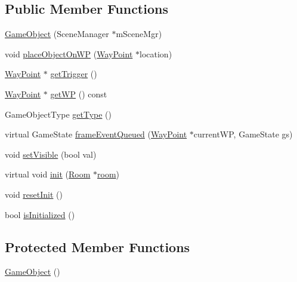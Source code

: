 \subsection*{\-Public \-Member \-Functions}
\begin{DoxyCompactItemize}
\item 
\hyperlink{classGameObject_a0996f1381d0512d9db0a89121e07335a}{\-Game\-Object} (\-Scene\-Manager $\ast$m\-Scene\-Mgr)
\item 
void \hyperlink{classGameObject_aa9a2c30e2cc2f6a7ddbb55d46dd9b45d}{place\-Object\-On\-W\-P} (\hyperlink{classWayPoint}{\-Way\-Point} $\ast$location)
\item 
\hyperlink{classWayPoint}{\-Way\-Point} $\ast$ \hyperlink{classGameObject_a0000c172fae6c5609ecd34ca0c335d8c}{get\-Trigger} ()
\item 
\hyperlink{classWayPoint}{\-Way\-Point} $\ast$ \hyperlink{classGameObject_a2e858346bacb7c0c078284dee036a927}{get\-W\-P} () const 
\item 
\-Game\-Object\-Type \hyperlink{classGameObject_a248b04d1269cb1d28c8b0cc2e886c1cb}{get\-Type} ()
\item 
virtual \-Game\-State \hyperlink{classGameObject_aa643df342c50df77f053eee2c703c619}{frame\-Event\-Queued} (\hyperlink{classWayPoint}{\-Way\-Point} $\ast$current\-W\-P, \-Game\-State gs)
\item 
void \hyperlink{classGameObject_a1f5648272592844af52605d1c83cc347}{set\-Visible} (bool val)
\item 
virtual void \hyperlink{classGameObject_ac3ab6708ce47b4ef8fd35d8bb43149dc}{init} (\hyperlink{classRoom}{\-Room} $\ast$\hyperlink{classGameObject_a9f63419cc03f2513f757a317a2e37557}{room})
\item 
void \hyperlink{classGameObject_afaea76d5acbb65e5f808bce98d8fda20}{reset\-Init} ()
\item 
bool \hyperlink{classGameObject_a5b3972654914248d6e757d409b596a96}{is\-Initialized} ()
\end{DoxyCompactItemize}
\subsection*{\-Protected \-Member \-Functions}
\begin{DoxyCompactItemize}
\item 
\hyperlink{classGameObject_a0348e3ee2e83d56eafca7a3547f432c4}{\-Game\-Object} ()
\end{DoxyCompactItemize}
